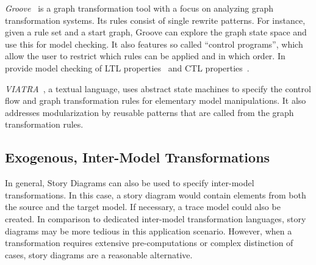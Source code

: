 \emph{Groove}~\cite{Ren04a} is a graph transformation tool with a focus on analyzing graph transformation systems.
Its rules consist of single rewrite patterns.
For instance, given a rule set and a start graph, Groove can explore the graph state space and use this for model checking.
It also features so called ``control programs'', which allow the user to restrict which rules can be applied and in which order. In provide model checking of LTL properties~\cite{Ren08} and CTL properties~\cite{KR06}.

\emph{VIATRA}~\cite{viatra}, a textual language, uses abstract state machines to specify the control flow and graph transformation rules for elementary model manipulations.
It also addresses modularization by reusable patterns that are called from the graph transformation rules. 



\subsection{Exogenous, Inter-Model Transformations}

In general, Story Diagrams can also be used to specify inter-model transformations.
In this case, a story diagram would contain elements from both the source and the target model.
If necessary, a trace model could also be created.
In comparison to dedicated inter-model transformation languages, story diagrams may be more tedious in this application scenario.
However, when a transformation requires extensive pre-computations or complex distinction of cases, story diagrams are a reasonable alternative.

